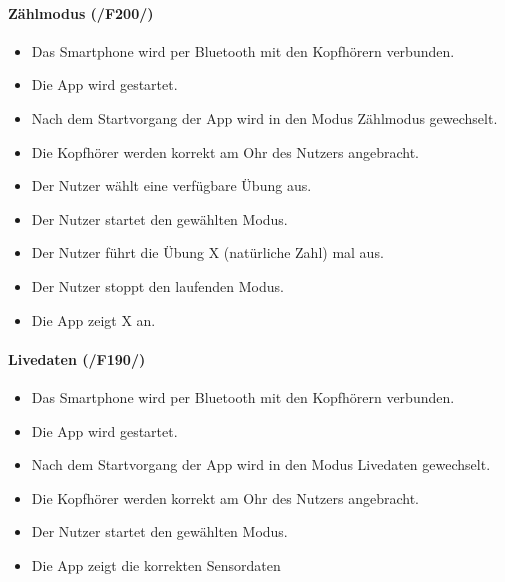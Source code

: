 \documentclass[a4paper,12pt]{article}
\begin{document}
  \paragraph{Zählmodus (/F200/)}
  \begin{itemize}
    \item[] Das Smartphone wird per Bluetooth mit den Kopfhörern verbunden.
    \item[] Die App wird gestartet.
    \item[] Nach dem Startvorgang der App wird in den Modus \glqq Zählmodus\grqq{} gewechselt.
    \item[] Die Kopfhörer werden korrekt am Ohr des Nutzers angebracht.
    \item[] Der Nutzer wählt eine verfügbare Übung aus. 
    \item[] Der Nutzer startet den gewählten Modus.
    \item[] Der Nutzer führt die Übung X (natürliche Zahl) mal aus.
    \item[] Der Nutzer stoppt den laufenden Modus.
    \item[] Die App zeigt X an.
  \end{itemize}

  \paragraph{Livedaten (/F190/)}
  \begin{itemize}
    \item[] Das Smartphone wird per Bluetooth mit den Kopfhörern verbunden.
    \item[] Die App wird gestartet.
    \item[] Nach dem Startvorgang der App wird in den Modus \glqq Livedaten\grqq{} gewechselt.
    \item[] Die Kopfhörer werden korrekt am Ohr des Nutzers angebracht.
    \item[] Der Nutzer startet den gewählten Modus.
    \item[] Die App zeigt die korrekten Sensordaten 
  \end{itemize}
\end{document}
